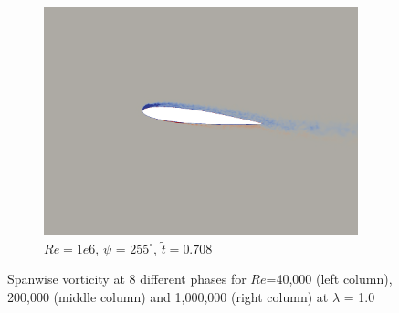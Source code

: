\begin{figure}[H]
\begin{subfigure}[b]{0.32\textwidth}
		\includegraphics[width=1\textwidth]{figures/Vorticity_plots/Re_1m_1pt0/phase_255.png}
		\caption{$Re=1e6$, $\psi$ = $255^\circ$, $\tilde{t}=0.708$}
		\label{fig:Re_1m_1pt0_phi255}
	\end{subfigure}
	
	\caption{Spanwise vorticity at 8 different phases for $Re$=40,000 (left column), 200,000 (middle column) and 1,000,000 (right column) at $\lambda$ = 1.0}
	\label{fig:vortScreen_1pt0}
\end{figure}


